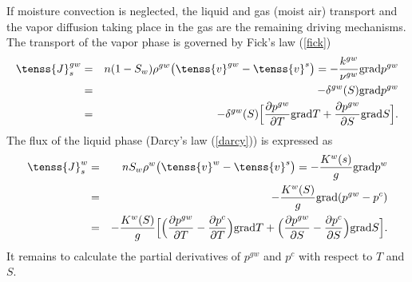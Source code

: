 If moisture convection is neglected, the liquid and gas (moist air) transport and 
the vapor diffusion taking place in the gas are the remaining driving mechanisms.
The transport of the vapor phase is governed by Fick's law (\ref{fick})
\begin{eqnarray}\label{fick_2}
\tenss{J}^{gw}_s &=& n(1-S_w) \rho^{gw} \big( \tenss{v} ^{gw} - \tenss{v}^s \big) = 
- \frac{k^{gw}}{\nu^{gw}} {\rm grad} p^{gw}\nonumber\\
&=&-\delta^{gw}(S) {\rm grad} p^{gw}\nonumber\\
&=&-\delta^{gw}(S)\Big[\frac{\partial p^{gw}}{\partial T} {\rm grad} T + \frac{\partial p^{gw}}{\partial S} {\rm grad} 
S \Big].
\end{eqnarray}
The flux of the liquid phase (Darcy's law (\ref{darcy})) is expressed as
\begin{eqnarray}\label{darcy_2}
\tenss{J}_s^{w} &=& n S_w \rho^w \big( \tenss{v} ^{w} - \tenss{v}^s \big) = - \frac{K^w(s)}{g} {\rm grad} p^w\nonumber\\
&=& - \frac{K^w(S)}{g} {\rm grad} (p^{gw} - p^c)\nonumber\\
&=& - \frac{K^w(S)}{g}\Big[\Big(
\frac{\partial p^{gw}}{\partial T} - \frac{\partial p^{c}}{\partial T}\Big) {\rm grad} T
+ \Big(\frac{\partial p^{gw}}{\partial S} - \frac{\partial p^{c}}{\partial S}\Big) {\rm grad} S \Big].
\end{eqnarray}
It remains to calculate the partial derivatives of $p^{gw}$ and $p^c$ with respect to $T$ and $S$.

